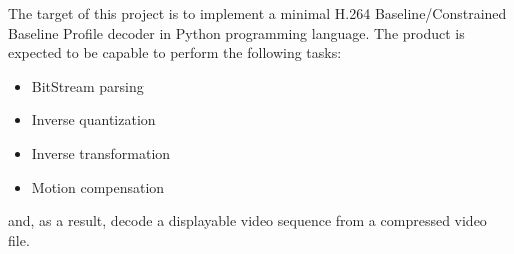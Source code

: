 \documentclass[../main.tex]{subfiles}
\begin{document}
The target of this project is to implement a minimal H.264 Baseline/Constrained Baseline Profile decoder in Python programming language. The product is expected to be capable to perform the following tasks:

\begin{itemize}
\item BitStream parsing 
\item Inverse quantization
\item Inverse transformation
\item Motion compensation
\end{itemize}

and, as a result, decode a displayable video sequence from a compressed video file.
\end{document}
